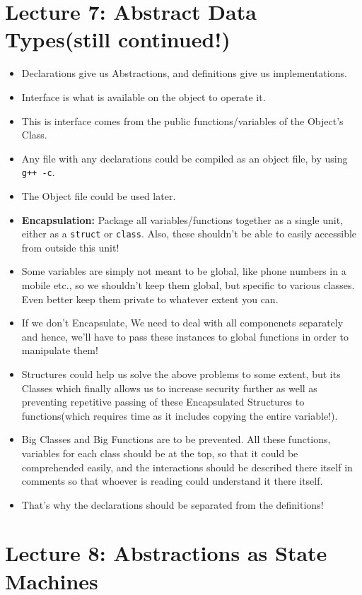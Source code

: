 \documentclass{article}
\begin{document}
\section{Lecture 7: Abstract Data Types(still continued!)}
\begin{itemize}
  \item  Declarations give us Abstractions, and definitions give us implementations.
  \item  Interface is what is available on the object to operate it.
  \item This is interface comes from the public functions/variables of the Object's Class.
  \item Any file with any declarations could be compiled as an object file, by using \verb|g++ -c|.
  \item The Object file could be used later.
  \item \textbf{Encapsulation:} Package all variables/functions together as a single unit, either as a \verb|struct| or \verb|class|. Also, these shouldn't be able to easily accessible from outside this unit!
  \item Some variables are simply not meant to be global, like phone numbers in a mobile etc., so we shouldn't keep them global, but specific to various classes. Even better keep them private to whatever extent you can.
  \item If we don't Encapsulate, We need to deal with all componenets separately and hence, we'll have to pass these instances to global functions in order to manipulate them!
  \item Structures could help us solve the above problems to some extent, but its Classes which finally allows us to increase security further as well as preventing repetitive passing of these Encapsulated Structures to functions(which requires time as it includes copying the entire variable!).
  \item Big Classes and Big Functions are to be prevented. All these functions, variables for each class should be at the top, so that it could be comprehended easily, and the interactions should be described there itself in comments so that whoever is reading could understand it there itself.
  \item That's why the declarations should be separated from the definitions!
\end{itemize}

\section{Lecture 8: Abstractions as State Machines}
\end{document}
